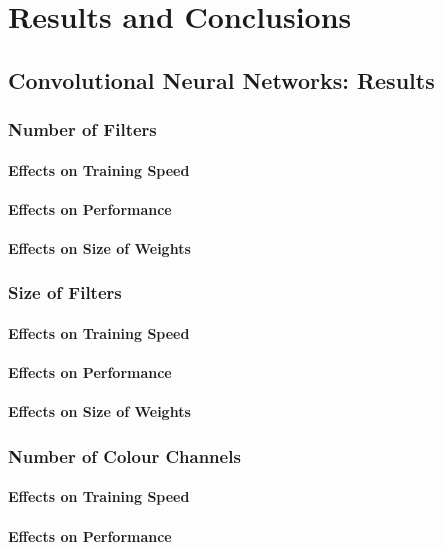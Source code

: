\chapter{Results and Conclusions}

\section{Convolutional Neural Networks: Results}
\subsection{Number of Filters}
\subsubsection{Effects on Training Speed}
\subsubsection{Effects on Performance}
\subsubsection{Effects on Size of Weights}

\subsection{Size of Filters}
\subsubsection{Effects on Training Speed}
\subsubsection{Effects on Performance}
\subsubsection{Effects on Size of Weights}

\subsection{Number of Colour Channels}
\subsubsection{Effects on Training Speed}
\subsubsection{Effects on Performance}

